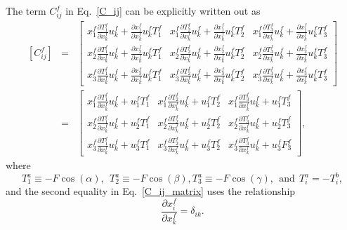 The term $C_{ij}^f$ in Eq.\ \eqref{C_ij} can be explicitly written out as
%
\begin{eqnarray}
\left[ C_{ij}^f \right] &=& 
\begin{bmatrix}
x_1^f \frac{\partial T_1^f}{\partial x_k^f} u_k^f + \frac{\partial x_1^f}{\partial x_k^f}u_k^f T_1^f  & x_1^f \frac{\partial T_2^f}{\partial x_k^f} u_k^f + \frac{\partial x_1^f}{\partial x_k^f}u_k^f T_2^f & x_1^f \frac{\partial T_3^f}{\partial x_k^f} u_k^f + \frac{\partial x_1^f}{\partial x_k^f}u_k^f T_3^f\\
%
x_2^f \frac{\partial T_1^f}{\partial x_k^f} u_k^f  + \frac{\partial x_2^f}{\partial x_k^f} u_k^fT_1^f & x_2^f \frac{\partial T_2^f}{\partial x_k^f} u_k^f  + \frac{\partial x_2^f}{\partial x_k^f} u_k^fT_2^f & x_2^f \frac{\partial T_3^f}{\partial x_k^f} u_k^f  + \frac{\partial x_2^f}{\partial x_k^f} u_k^fT_3^f \\
%
x_3^f \frac{\partial T_1^f}{\partial x_k^f} u_k^f  + \frac{\partial x_3^f}{\partial x_k^f}u_k^f T_1^f & x_3^f \frac{\partial T_2^f}{\partial x_k^f} u_k^f + \frac{\partial x_3^f}{\partial x_k^f} u_k^f T_2^f & x_3^f \frac{\partial T_3^f}{\partial x_k^f} u_k^f + \frac{\partial x_3^f}{\partial x_k^f}u_k^f T_3^f
\end{bmatrix} \nonumber\\
%
&=&
%
\begin{bmatrix}
x_1^f \frac{\partial T_1^f}{\partial x_k^f} u_k^f +  u_1^f T_1^f  & x_1^f \frac{\partial T_2^f}{\partial x_k^f} u_k^f + u_1^f T_2^f & x_1^f \frac{\partial T_3^f}{\partial x_k^f} u_k^f + u_1^f T_3^f\\
%
x_2^f \frac{\partial T_1^f}{\partial x_k^f} u_k^f  +  u_2^f T_1^f & x_2^f \frac{\partial T_2^f}{\partial x_k^f} u_k^f  + u_2^f T_2^f & x_2^f \frac{\partial T_3^f}{\partial x_k^f} u_k^f  + u_2^f T_3^f \\
%
x_3^f \frac{\partial T_1^f}{\partial x_k^f} u_k^f  + u_3^f T_1^f & x_3^f \frac{\partial T_2^f}{\partial x_k^f} u_k^f + u_3^f T_2^f & x_3^f \frac{\partial T_3^f}{\partial x_k^f} u_k^f + u_3^f F_3^f
\label{C_ij_matrix}
\end{bmatrix} ,
%
\end{eqnarray}
%
where 
%
\begin{equation}
T_1^a \equiv -F \cos(\alpha), \ \ T_2^a \equiv -F \cos(\beta), T_3^a \equiv -F \cos(\gamma), \ \ \text{and} \ \ T_i^a = -T_i^b,
\end{equation}
%
and the second equality in Eq.\ \eqref{C_ij_matrix} uses the relationship
%
\begin{equation}
\frac{\partial x_i^f}{\partial x_k^f} = \delta_{ik} .
\end{equation}
%

